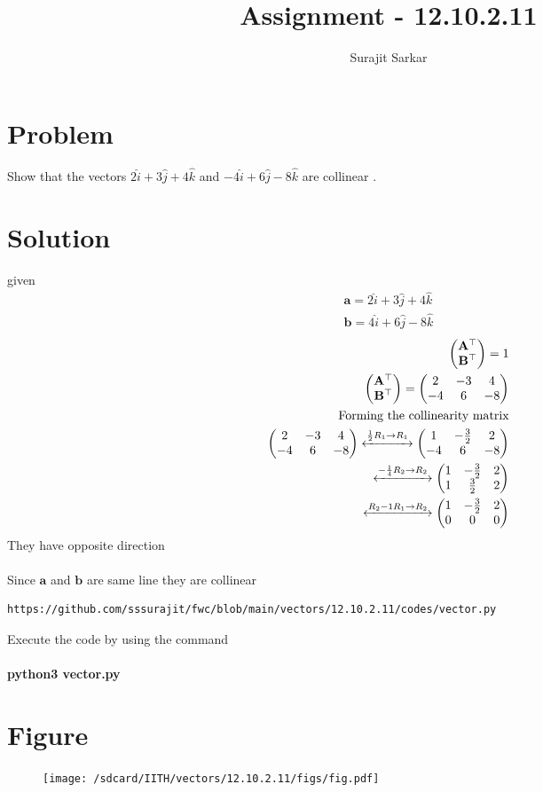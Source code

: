 \documentclass[journal,12pt,twocolumn]{IEEEtran}
\title{\mytitle}
\title{
Assignment - 12.10.2.11
}
\author{Surajit Sarkar}
\newcommand{\myvec}[1]{\ensuremath{\begin{pmatrix}#1\end{pmatrix}}}
\let\vec\mathbf
\begin{document}
\maketitle
\tableofcontents
\bigskip
\section{\textbf{Problem}}
Show that the vectors $2\hat{i}+3\hat{j}+4\hat{k}$ and $-4\hat{i}+6\hat{j}-8\hat{k}$ are collinear .
\section{\textbf{Solution}}
given
\begin{align}
\vec{a}=2\hat{i}+3\hat{j}+4\hat{k}\\
\vec{b}=4\hat{i}+6\hat{j}-8\hat{k}
\end{align}
\begin{align}
    \myvec{\vec{A}^{\top}\\ \vec{B}^{\top}}=1\\
\myvec{\vec{A}^{\top}\\ \vec{B}^{\top}}=\myvec{2&-3&4\\-4&6&-8}\\
\text{Forming the collinearity matrix}\\
\myvec{2&-3&4\\-4&6&-8} \xleftrightarrow{\frac{1}{2}R_1\to R_1}\myvec{1&-\frac{3}{2}&2\\-4&6&-8}\\
\xleftrightarrow{-\frac{1}{4}R_2\to R_2}\myvec{1&-\frac{3}{2}&2\\1&\frac{3}{2}&2}\\
\xleftrightarrow{R_2-1R_1\to R_2}\myvec{1&-\frac{3}{2}&2\\0&0&0}
\end{align}
  They have opposite direction \\
  \\
  Since $\vec{a}$ and $\vec{b}$ are same line they are collinear
\begin{lstlisting}
https://github.com/sssurajit/fwc/blob/main/vectors/12.10.2.11/codes/vector.py
\end{lstlisting}
Execute the code by using the command\\
\\
\textbf{python3 vector.py}\\
\section{\textbf{Figure}}
\begin{figure}[!ht]
    \centering
\texttt{[image: /sdcard/IITH/vectors/12.10.2.11/figs/fig.pdf]}
\caption{}
\label{fig:vec}
\end{figure}
\end{document}
